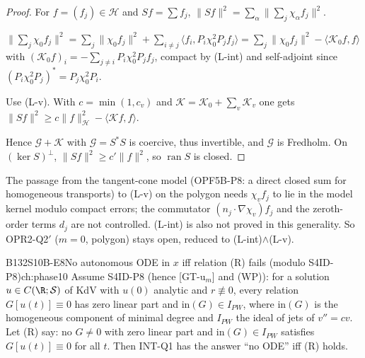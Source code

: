 \begin{proof}
For $f=(f_j)\in\mathcal H$ and $S f=\sum f_j$, $\|Sf\|^2=\sum_\alpha\|\sum_j\chi_\alpha f_j\|^2$.

$\|\sum_j\chi_0f_j\|^2=\sum_j\|\chi_0f_j\|^2+\sum_{i\ne j}\langle f_i,P_i\chi_0^2P_jf_j\rangle=\sum_j\|\chi_0f_j\|^2-\langle\mathcal K_0f,f\rangle$ with $(\mathcal K_0f)_i=-\sum_{j\ne i}P_i\chi_0^2P_jf_j$, compact by (L-int) and self-adjoint since $(P_i\chi_0^2P_j)^*=P_j\chi_0^2P_i$.

Use (L-v). With $c=\min(1,c_v)$ and $\mathcal K=\mathcal K_0+\sum_v\mathcal K_v$ one gets $\|Sf\|^2\ge c\|f\|^2_{\mathcal H}-\langle\mathcal Kf,f\rangle$.

Hence $\mathcal G+\mathcal K$ with $\mathcal G=S^*S$ is coercive, thus invertible, and $\mathcal G$ is Fredholm. On $(\ker S)^\perp$, $\|Sf\|^2\ge c'\|f\|^2$, so $\operatorname{ran}S$ is closed.

\end{proof}

\begin{caution}[title=What is not proved]
The passage from the tangent-cone model (OPF5B-P8: a direct closed sum for homogeneous transports) to (L-v) on the polygon needs $\chi_vf_j$ to lie in the model kernel modulo compact errors; the commutator $(n_j\cdot\nabla\chi_v)f_j$ and the zeroth-order terms $d_j$ are not controlled. (L-int) is also not proved in this generality. So OPR2-Q2$'$ ($m=0$, polygon) stays open, reduced to (L-int)$\wedge$(L-v).
\end{caution}

\begin{dimcard}{B132}{S10B-E8}{No autonomous ODE in $x$ iff relation (R) fails (modulo S4ID-P8)}{\condl}{ch:phase10}
Assume S4ID-P8 (hence [GT-u$_m$] and (WP)): for a solution $u\in C(\R;\mathcal S)$ of KdV with $u(0)$ analytic and $r\not\equiv0$, every relation $G[u(t)]\equiv0$ has zero linear part and $\mathrm{in}(G)\in I_{PW}$, where $\mathrm{in}(G)$ is the homogeneous component of minimal degree and $I_{PW}$ the ideal of jets of $v''=cv$. Let (R) say: no $G\ne0$ with zero linear part and $\mathrm{in}(G)\in I_{PW}$ satisfies $G[u(t)]\equiv0$ for all $t$. Then INT-Q1 has the answer ``no ODE'' iff (R) holds.
\end{dimcard}


